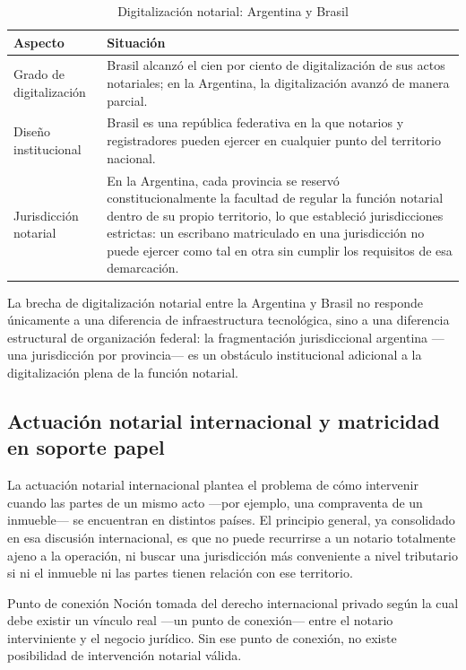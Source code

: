 \documentclass[12pt,oneside]{book}
\begin{document}
\begin{table}[H]
\centering
\caption{Digitalización notarial: Argentina y Brasil}
\begin{tabularx}{\textwidth}{>{\raggedright\arraybackslash}p{} X}
\toprule
\textbf{Aspecto} & \textbf{Situación} \\
\midrule
Grado de digitalización & Brasil alcanzó el cien por ciento de digitalización de sus actos notariales; en la Argentina, la digitalización avanzó de manera parcial. \\
Diseño institucional & Brasil es una república federativa en la que notarios y registradores pueden ejercer en cualquier punto del territorio nacional. \\
Jurisdicción notarial & En la Argentina, cada provincia se reservó constitucionalmente la facultad de regular la función notarial dentro de su propio territorio, lo que estableció jurisdicciones estrictas: un escribano matriculado en una jurisdicción no puede ejercer como tal en otra sin cumplir los requisitos de esa demarcación. \\
\bottomrule
\end{tabularx}
\end{table}

\begin{important}
La brecha de digitalización notarial entre la Argentina y Brasil no responde únicamente a una diferencia de infraestructura tecnológica, sino a una diferencia estructural de organización federal: la fragmentación jurisdiccional argentina ---una jurisdicción por provincia--- es un obstáculo institucional adicional a la digitalización plena de la función notarial.
\end{important}

\subsection{Actuación notarial internacional y matricidad en soporte papel}

La actuación notarial internacional plantea el problema de cómo intervenir cuando las partes de un mismo acto ---por ejemplo, una compraventa de un inmueble--- se encuentran en distintos países. El principio general, ya consolidado en esa discusión internacional, es que no puede recurrirse a un notario totalmente ajeno a la operación, ni buscar una jurisdicción más conveniente a nivel tributario si ni el inmueble ni las partes tienen relación con ese territorio.

\begin{definition}{Punto de conexión}
Noción tomada del derecho internacional privado según la cual debe existir un vínculo real ---un punto de conexión--- entre el notario interviniente y el negocio jurídico. Sin ese punto de conexión, no existe posibilidad de intervención notarial válida.
\end{definition}
\end{document}
